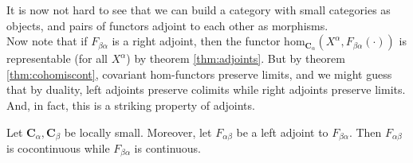 It is now not hard to see that we can build a category with small categories as objects, and pairs of functors adjoint to each other as morphisms.
\\
Now note that if $F_{\beta\alpha}$ is a right adjoint, then the functor $\mathrm{hom}_{\mathbf{C}_{\alpha}}(X^{\alpha},F_{\beta\alpha}(\cdot))$ is representable (for all $X^{\alpha}$) by theorem \ref{thm:adjoints}.
But by theorem \ref{thm:cohomiscont}, covariant hom-functors preserve limits, and we might guess that by duality, left adjoints preserve colimits while right adjoints preserve limits.
And, in fact, this is a striking property of adjoints.
\\
\begin{thm}
\label{thm:adjointlimit}
Let $\mathbf{C}_{\alpha},\mathbf{C}_{\beta}$ be locally small.
Moreover, let $F_{\alpha\beta}$ be a left adjoint to $F_{\beta\alpha}$.
Then $F_{\alpha\beta}$ is cocontinuous while $F_{\beta\alpha}$ is continuous.
\end{thm}
